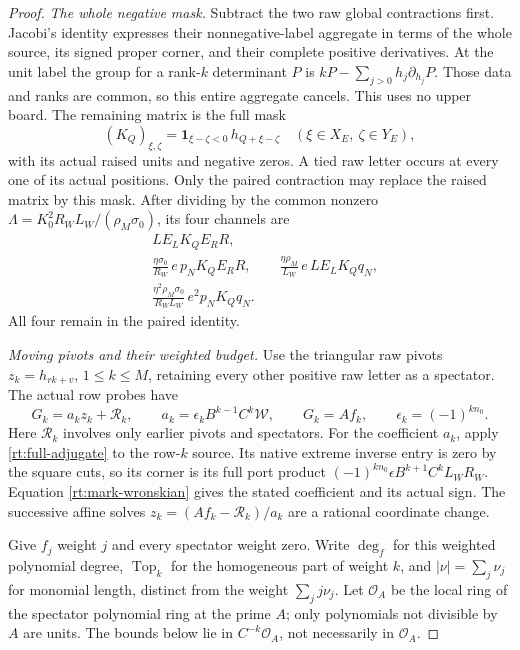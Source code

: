 \documentclass[11pt,a4paper]{amsart}
\numberwithin{equation}{section}
\theoremstyle{plain}
\theoremstyle{definition}
\newcommand{\one}{\mathbf1}
\begin{document}
\begin{proof}
\smallskip\noindent\emph{The whole negative mask.}
Subtract the two raw global contractions first.  Jacobi's identity
expresses their nonnegative-label aggregate in terms of the whole
source, its signed proper corner, and their complete positive
derivatives.  At the unit label the group for a rank-\(k\) determinant
\(P\) is \(kP-\sum_{j>0}h_j\partial_{h_j}P\).
Those data and ranks are common, so this entire aggregate cancels.
This uses no upper board.  The remaining matrix is the full mask
\[
 (K_Q)_{\xi,\zeta}
   =\one_{\xi-\zeta<0}\,h_{Q+\xi-\zeta}
       \quad(\xi\in X_E,\ \zeta\in Y_E),
\]
with its actual raised units and negative zeros.  A tied raw letter
occurs at every one of its actual positions.
Only the paired contraction may replace the raised matrix by this mask.
After dividing by the common nonzero
\(\Lambda=K_0^2R_WL_W/(\rho_M\sigma_0)\), its four channels are
\[
 \begin{aligned}
 &LE_LK_QE_RR,\\
 &\frac{\eta\sigma_0}{R_W}\,e\,p_NK_QE_RR,\qquad
   \frac{\eta\rho_M}{L_W}\,e\,LE_LK_Qq_N,\\
 &\frac{\eta^2\rho_M\sigma_0}{R_WL_W}\,e^2p_NK_Qq_N.
 \end{aligned}
\]
All four remain in the paired identity.

\smallskip\noindent\emph{Moving pivots and their weighted budget.}
Use the triangular raw pivots \(z_k=h_{rk+v}\), \(1\le k\le M\),
retaining every other positive raw letter as a spectator.  The actual row probes have
\[
 G_k=a_k z_k+\mathscr R_k,\qquad
 a_k=\epsilon_k B^{k-1}C^k\mathcal W,\qquad G_k=Af_k,
 \qquad \epsilon_k=(-1)^{kn_0}.
\]
Here \(\mathscr R_k\) involves only earlier pivots and spectators.
For the coefficient \(a_k\), apply \eqref{rt:full-adjugate} to the
row-\(k\) source.  Its native extreme inverse entry is zero by the
square cuts, so its corner is its full port product
\((-1)^{kn_0}\epsilon B^{k+1}C^kL_WR_W\).
Equation \eqref{rt:mark-wronskian} gives the stated coefficient and
its actual sign.  The successive affine solves
\(z_k=(Af_k-\mathscr R_k)/a_k\) are a rational coordinate change.

Give \(f_j\) weight \(j\) and every spectator weight zero.
Write \(\deg_f\) for this weighted polynomial degree,
\(\operatorname{Top}_k\) for the homogeneous part of weight \(k\),
and \(|\nu|=\sum_j\nu_j\) for monomial length, distinct from
the weight \(\sum_jj\nu_j\).
Let \(\mathcal O_A\) be the local ring of the spectator polynomial
ring at the prime \(A\); only polynomials not divisible by \(A\)
are units.  The bounds below lie in \(C^{-k}\mathcal O_A\),
not necessarily in \(\mathcal O_A\).


\end{proof}
\end{document}
